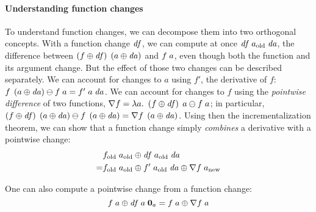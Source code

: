 \paragraph{Understanding function changes}
To understand function changes, we can decompose them
into two orthogonal concepts. With a function change $\mathit{df}$, we can compute at
once $\App{\App{\D f}{\Old{a}}}{\D a}$, the difference between $\App {\Upd*{f}} {\Upd*{a}}$ and $\App
{{f}} {{a}}$, even though both the function and its argument change.
But the effect of those two changes can be described separately.
We can account for changes to $a$ using $f'$, the derivative of $f$: $\App{{f}} {\Upd*{a}} \DIFF \App{{f}} {{a}} = \App{\App{f'}{{a}}}{\D a}$.
We can account for changes to $f$ using the \emph{pointwise difference} of two functions, $\nabla
f = \Lam{a}{\App{\Upd*{f}}{a} \DIFF \App{{f}}{a}}$; in particular, $\Upd*{f} \APP \Upd*{a} \DIFF {f} \APP \Upd*{a} = \nabla f \APP \Upd*{a}$.
Using then the incrementalization theorem, we can show that a function change simply \emph{combines} a derivative with a pointwise change:
%
%
%
\begin{align*}
  & \Update{\App {\Old{f}} {\Old{a}}}{\App{\App{\D f}{\Old{a}}}{\D a}} \\
= & \Update{\App{\Old{f}}{\Old{a}}}{\App{\App{f'}{\Old{a}}}{\D a}} \UPDATE \App{\nabla f}{\New{a}}
\end{align*}

One can also compute a pointwise change from a function change:
\[
  \Update{\App {f} {a}}{\App{\App{\D f}{a}}{\NilC{a}}}
= \App{f}{a} \UPDATE \App{\nabla f}{a}
\]

